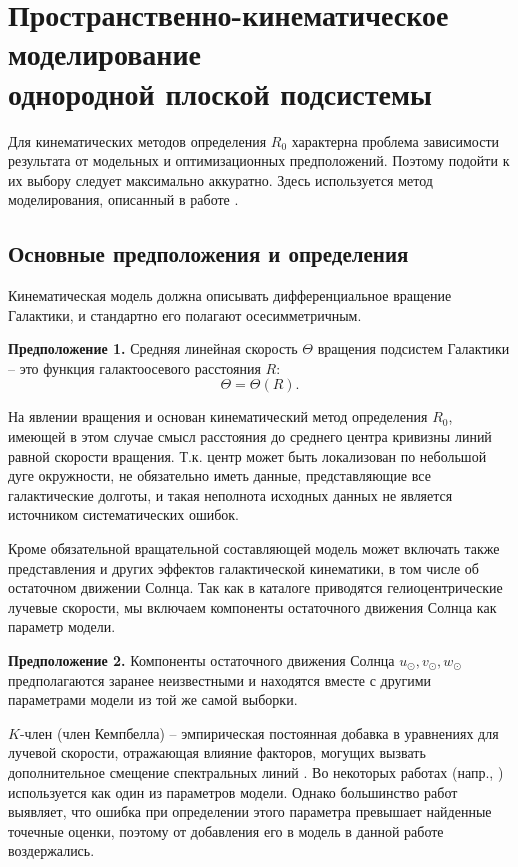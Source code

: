 \documentclass{matmex-diploma-custom}
\begin{document}
\par 
\section{Пространственно-кинематическое моделирование \\ однородной плоской подсистемы}
Для кинематических методов определения $R_0$ характерна проблема зависимости результата от модельных и оптимизационных предположений. Поэтому подойти к их выбору следует максимально аккуратно. Здесь используется метод моделирования, описанный в работе \cite{NIIm}.
\subsection{Основные предположения и определения}
Кинематическая модель должна описывать дифференциальное вращение Галактики, и стандартно его полагают осесимметричным.

\textbf{Предположение 1.}
Средняя линейная скорость $\Theta$ вращения подсистем Галактики -- это функция галактоосевого расстояния $R$: 
\begin{equation}
        \Theta = \Theta(R).
\end{equation}

На явлении вращения и основан кинематический метод определения $R_0$, имеющей в этом случае смысл расстояния до среднего центра кривизны линий равной скорости вращения. Т.к. центр может быть локализован по небольшой дуге окружности, не обязательно иметь данные, представляющие все галактические долготы, и такая неполнота исходных данных не является источником систематических ошибок.
\par Кроме обязательной вращательной составляющей модель может включать также представления и других эффектов галактической кинематики, в том числе об остаточном движении Солнца. Так как в каталоге приводятся гелиоцентрические лучевые скорости, мы включаем компоненты остаточного движения Солнца как параметр модели. 

\textbf{Предположение 2.}
Компоненты остаточного движения Солнца $u_{\odot}, v_{\odot}, w_{\odot}$ предполагаются заранее неизвестными и находятся вместе с другими параметрами модели из той же самой выборки.

\par $K$-член (член Кемпбелла) -- эмпирическая постоянная добавка в уравнениях для лучевой скорости, отражающая влияние факторов, могущих вызвать дополнительное смещение спектральных линий \cite{Kulik}. Во некоторых работах (напр., \cite{Loktin, Balona}) используется как один из параметров модели. Однако большинство работ выявляет, что ошибка при определении этого параметра превышает найденные точечные оценки, поэтому от добавления его в модель в данной работе воздержались.
\end{document}
